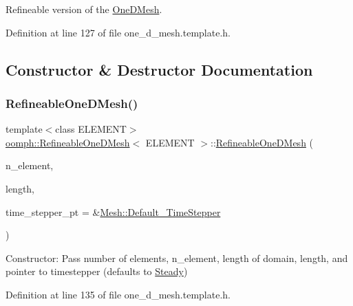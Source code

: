 Refineable version of the \hyperlink{classoomph_1_1OneDMesh}{One\+D\+Mesh}. 

Definition at line 127 of file one\+\_\+d\+\_\+mesh.\+template.\+h.



\subsection{Constructor \& Destructor Documentation}
\mbox{\label{classoomph_1_1RefineableOneDMesh_afd56915c8d1092fe6063184431c2d322}} 
\subsubsection{\texorpdfstring{Refineable\+One\+D\+Mesh()}{RefineableOneDMesh()}\hspace{0.1cm}{\footnotesize\ttfamily [1/2]}}
{\footnotesize\ttfamily template$<$class E\+L\+E\+M\+E\+NT$>$ \\
\hyperlink{classoomph_1_1RefineableOneDMesh}{oomph\+::\+Refineable\+One\+D\+Mesh}$<$ E\+L\+E\+M\+E\+NT $>$\+::\hyperlink{classoomph_1_1RefineableOneDMesh}{Refineable\+One\+D\+Mesh} (\begin{DoxyParamCaption}\item[{const unsigned \&}]{n\+\_\+element,  }\item[{const double \&}]{length,  }\item[{\hyperlink{classoomph_1_1TimeStepper}{Time\+Stepper} $\ast$}]{time\+\_\+stepper\+\_\+pt = {\ttfamily \&\hyperlink{classoomph_1_1Mesh_a12243d0fee2b1fcee729ee5a4777ea10}{Mesh\+::\+Default\+\_\+\+Time\+Stepper}} }\end{DoxyParamCaption})\hspace{0.3cm}{\ttfamily [inline]}}



Constructor\+: Pass number of elements, n\+\_\+element, length of domain, length, and pointer to timestepper (defaults to \hyperlink{classoomph_1_1Steady}{Steady}) 



Definition at line 135 of file one\+\_\+d\+\_\+mesh.\+template.\+h.

\mbox{\label{classoomph_1_1RefineableOneDMesh_a6745ddd579ead642b9eac1b1520d4b5c}} 

